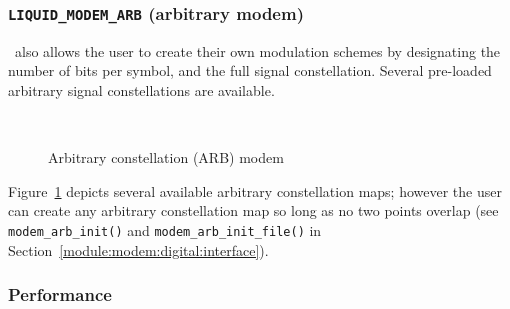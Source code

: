 \subsubsection{{\tt LIQUID\_MODEM\_ARB} (arbitrary modem)}
\label{module:modem:digital:ARB}
\liquid\ also allows the user to create their own modulation schemes by
designating the number of bits per symbol, and the full signal constellation.
Several pre-loaded arbitrary signal constellations are available.
%
\begin{figure}
\centering
\mbox{
   \quad
   \quad
}
\mbox{
   \quad
   \quad
}
\mbox{
   \quad
   \quad
}
\caption{Arbitrary constellation (ARB) modem}
\label{fig:modem:arb}
\end{figure}
%
Figure~\ref{fig:modem:arb} depicts several available arbitrary
constellation maps;
however the user can create any arbitrary constellation map so long as
no two points overlap
(see {\tt modem\_arb\_init()} and {\tt modem\_arb\_init\_file()} in
Section~\ref{module:modem:digital:interface}).

\subsubsection{Performance}
\label{module:modem:digital:performance}

